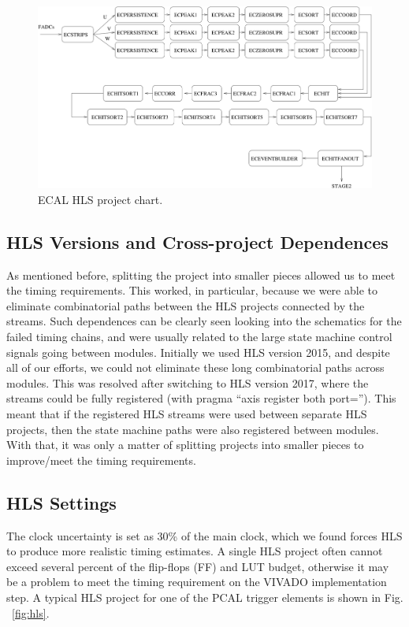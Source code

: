 \begin{figure}[hbt]
	\centering
	\includegraphics[width=1.0\columnwidth,keepaspectratio]{img/hls_chart.png}
	\caption{ECAL HLS project chart.}
	\label{fig:hls_chart}
\end{figure}


\subsection{HLS Versions and Cross-project Dependences}

As mentioned before, splitting the project into smaller pieces allowed us to meet the timing requirements. This worked, in particular, because we were able to eliminate combinatorial paths between the HLS projects connected by the streams. Such dependences can be clearly seen looking into the schematics for the failed timing chains, and were usually related to the large state machine control signals going between modules. Initially we used HLS version 2015, and despite all of our efforts, we could not eliminate these long combinatorial paths across modules. This was resolved after switching to HLS version 2017, where the streams could be fully registered (with pragma ``axis register both port=''). This meant that if the registered HLS streams were used between separate HLS projects, then the state machine paths were also registered between modules. With that, it was only a matter of splitting projects into smaller pieces to improve/meet the timing requirements.


\subsection{HLS Settings}

The clock uncertainty is set as 30\% of the main clock, which we found forces HLS to produce more realistic timing estimates. A single HLS project often cannot exceed several percent of the flip-flops (FF) and LUT budget, otherwise it may be a problem to meet the timing requirement on the VIVADO implementation step. A typical HLS project for one of the PCAL trigger elements is shown in Fig. ~\ref{fig:hls}.

